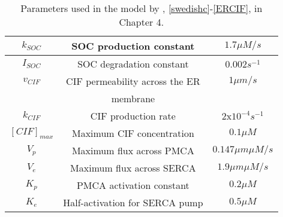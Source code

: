 \begin{table}[h!!!t!!!b!!!p]
\begin{center}
\begin{tabular}{ c c c }
\hline
$k_{SOC}$ & SOC production constant & $1.7 \mu M/s$\\
\hline
$I_{SOC}$ & SOC degradation constant & $0.002 s^{-1}$\\
\hline
$v_{CIF}$ & CIF permeability across the ER & $1 \mu m/s$\\
& membrane & \\
\hline
$k_{CIF}$ & CIF production rate & $2$x$10^{-4}s^{-1}$\\
\hline
$[CIF]_{max}$ & Maximum CIF concentration & $0.1\mu M$\\
\hline
$V_{p}$ & Maximum flux across PMCA & $0.147 \mu m \mu M/s$\\
\hline
$V_{e}$ & Maximum flux across SERCA & $1.9 \mu m \mu M/s$\\
\hline
$K_{p}$ & PMCA activation constant & $0.2 \mu M$\\
\hline
$K_{e}$ & Half-activation for SERCA pump & $0.5 \mu M$\\
\end{tabular}
\end{center}
\caption{Parameters used in the model by , \eqref{swedishc}-\eqref{ERCIF}, in Chapter 4.}\label{swedishparam}
\end{table}

